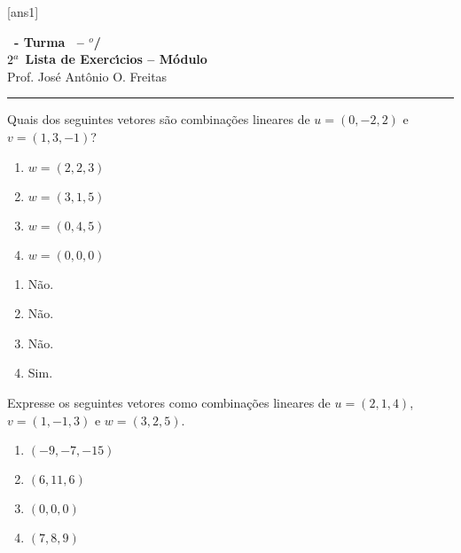 \documentclass[12pt]{exam}
\begin{document}
  [ans1]
  \begin{center}
    {\Large\bf \disciplina\ - Turma \turma\ -- \semestre$^{o}$/\ano} \\ \vspace{9pt} {\large\bf
        $2^a$ Lista de Exerc{\'\i}cios -- Módulo \numeromodulo}\\ \vspace{9pt} Prof. Jos{\'e} Ant{\^o}nio O. Freitas
  \end{center}
  \hrule


\begin{exercicio}
    Quais dos seguintes vetores são combinações lineares de $u = (0, -2, 2)$ e $v = (1, 3, -1)$?
    \begin{multicols}{2}
        \begin{enumerate}[label={\alph*})]
            \item $w = (2, 2, 3)$

            \item $w = (3, 1, 5)$

            \item $w = (0, 4, 5)$

            \item $w = (0, 0, 0)$
        \end{enumerate}
    \end{multicols}
    \begin{solucao}
        \begin{enumerate}[label={\alph*})]
          \item Não.

          \item Não.

          \item Não.

          \item Sim.
        \end{enumerate}
    \end{solucao}
\end{exercicio}

\begin{exercicio}
    Expresse os seguintes vetores como combinações lineares de $u = (2, 1, 4)$, $v = (1, -1, 3)$ e $w = (3, 2, 5)$.
    \begin{multicols}{2}
        \begin{enumerate}[label={\alph*})]
            \item $(-9, -7, -15)$

            \item $(6, 11, 6)$

            \item $(0, 0, 0)$

            \item $(7, 8, 9)$
        \end{enumerate}
    \end{multicols}
\end{exercicio}
\end{document}
